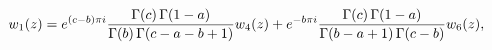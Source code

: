 \[w_{1}(z)=e^{(c-b)\pi i}\frac{\mathop{\Gamma\/}\nolimits\!\left(c\right)\mathop%
{\Gamma\/}\nolimits\!\left(1-a\right)}{\mathop{\Gamma\/}\nolimits\!\left(b%
\right)\mathop{\Gamma\/}\nolimits\!\left(c-a-b+1\right)}w_{4}(z)+e^{-b\pi i}%
\frac{\mathop{\Gamma\/}\nolimits\!\left(c\right)\mathop{\Gamma\/}\nolimits\!%
\left(1-a\right)}{\mathop{\Gamma\/}\nolimits\!\left(b-a+1\right)\mathop{\Gamma%
\/}\nolimits\!\left(c-b\right)}w_{6}(z),\]